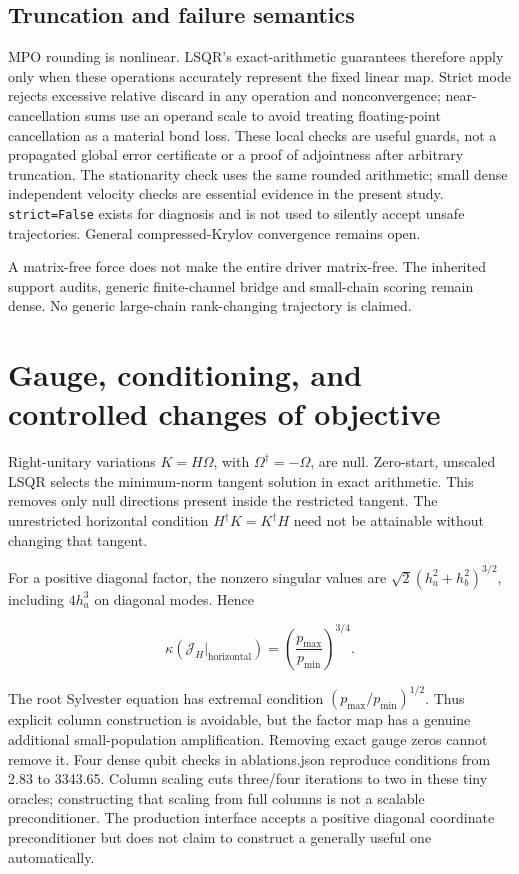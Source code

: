 \documentclass[10pt]{article}
\begin{document}
\subsection*{Truncation and failure semantics}

MPO rounding is nonlinear. LSQR's exact-arithmetic guarantees therefore apply
only when these operations accurately represent the fixed linear map. Strict
mode rejects excessive relative discard in any operation and nonconvergence;
near-cancellation sums use an operand scale to avoid treating floating-point
cancellation as a material bond loss. These local checks are useful guards,
not a propagated global error certificate or a proof of adjointness after
arbitrary truncation. The stationarity check uses the same rounded arithmetic;
small dense independent velocity checks are essential evidence in the present
study. \texttt{strict=False} exists for diagnosis and is not used to silently accept
unsafe trajectories. General compressed-Krylov convergence remains open.

A matrix-free force does not make the entire driver matrix-free. The inherited
support audits, generic finite-channel bridge and small-chain scoring remain
dense. No generic large-chain rank-changing trajectory is claimed.

\section*{Gauge, conditioning, and controlled changes of objective}

Right-unitary variations $K=H\Omega$, with $\Omega^\dagger=-\Omega$, are null.
Zero-start, unscaled LSQR selects the minimum-norm tangent solution in exact
arithmetic. This removes only null directions present inside the restricted
tangent. The unrestricted horizontal condition
$H^\dagger K=K^\dagger H$ need not be attainable without changing that tangent.

For a positive diagonal factor, the nonzero singular values are
$\sqrt{2}(h_a^2+h_b^2)^{3/2}$, including $4h_a^3$ on diagonal modes. Hence

\[
\kappa(\mathcal J_H|_{\mathrm{horizontal}})
=\left(\frac{p_{\max}}{p_{\min}}\right)^{3/4}.
\]

The root Sylvester equation has extremal condition
$(p_{\max}/p_{\min})^{1/2}$. Thus explicit column construction is avoidable,
but the factor map has a genuine additional small-population amplification.
Removing exact gauge zeros cannot remove it. Four dense qubit checks in
ablations.json reproduce conditions from 2.83 to
3343.65. Column scaling cuts three/four iterations to two in these tiny oracles;
constructing that scaling from full columns is not a scalable preconditioner.
The production interface accepts a positive diagonal coordinate preconditioner
but does not claim to construct a generally useful one automatically.
\end{document}
